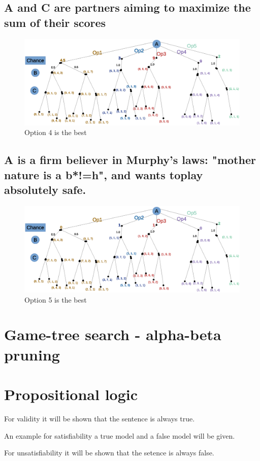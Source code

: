\documentclass{article}                     %
\begin{document}
	\subsection{A and C are partners aiming to maximize the sum of their scores}
	\begin{figure}[H]
		\centering
		\includegraphics[width=0.7\linewidth]{q3_4.eps}
		\caption{Option 4 is the best}
		\label{fig:q31}
	\end{figure}

	\subsection{A is a firm believer in Murphy's laws: "mother nature is a b*!=h", and wants toplay absolutely safe.}
	\begin{figure}[H]
		\centering
		\includegraphics[width=0.7\linewidth]{q3_5.eps}
		\caption{Option 5 is the best}
		\label{fig:q31}
	\end{figure}

	
	\section{Game-tree search - alpha-beta pruning}
	
	
	\section{Propositional logic}
	For validity it will be shown that the sentence is always true.
	
	An example for satisfiability a true model and a false model will be given.
	
	For unsatisfiability it will be shown that the setence is always false.
	
\end{document}
